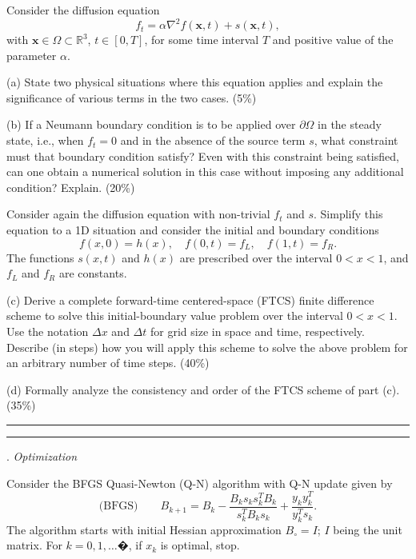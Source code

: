 \documentclass [11point]{article}
\begin{document}
Consider the diffusion equation $$f_t = \alpha \nabla^2 f(\mathbf{x},t)+ s(\mathbf{x},t),$$ with $\mathbf{x} \in \Omega \subset \mathbb{R}^3$, $t \in [0,T]$, for some time interval $T$ and positive value of the parameter $\alpha$.   

\medskip

(a) State two physical situations where this equation applies and explain the significance of various terms in the two cases. (5\%)

\medskip

(b) If a Neumann boundary condition is to be applied over $\partial \Omega$ in the steady state, i.e., when $f_t = 0$ and in the absence of the source term $s$, what constraint must that boundary condition satisfy? Even with this constraint being satisfied, can one obtain a numerical solution in this case without imposing any additional condition? Explain. (20\%) 

\bigskip

Consider again the diffusion equation with non-trivial $f_t$ and $s$. Simplify this equation to a 1D situation and consider the initial and boundary conditions 
$$ f(x,0) = h(x), \quad  f(0,t) = f_L,  \quad f(1,t) = f_R.$$
The functions $s(x,t)$ and $h(x)$ are prescribed over the interval $0<x<1$, and $f_L$ and $f_R$ are constants.

\medskip

(c) \quad Derive a complete forward-time centered-space (FTCS) finite difference scheme to solve this initial-boundary value problem over the interval $0<x<1$. Use the notation $\Delta x$ and $\Delta t$ for grid size in space and time, respectively. Describe (in steps) how you will apply this scheme to solve the above problem for an arbitrary number of time steps. (40\%)

\medskip

(d) \quad Formally analyze the consistency and order of the FTCS scheme of part (c). (35\%)

\bigskip

\hrule 




\pagebreak
\hrule 
{}. \textit{Optimization}
\bigskip

Consider the BFGS Quasi-Newton (Q-N) algorithm with Q-N update given by $$ \mbox{(BFGS)} \qquad B_{k+1} = B_k  - \frac{B_k s_k s_k^T B_k}{s_k^TB_ks_k} + \frac{y_k y_k^T}{y_k^T s_k}.$$
The algorithm starts with initial Hessian approximation $B_{\circ} = I$; $I$ being  the unit matrix. For $k = 0, 1, \ldots �$, if $x_k$ is optimal, stop.
\end{document}
